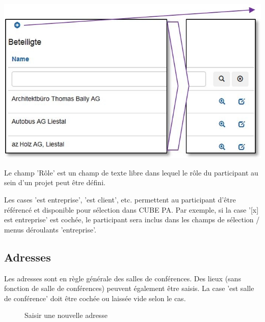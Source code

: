 \begin{center}
\hspace{-15pt}   
\includegraphics[width=.9\linewidth]{../chapters/13_Konfigurationen/pictures/13-4_Beteiligte.jpg}
\end{center}

Le champ 'Rôle' est un champ de texte libre dans lequel le rôle du participant au sein d'un projet peut être défini.

\vspace{\baselineskip}

Les cases 'est entreprise', 'est client', etc. permettent au participant d'être référencé et disponible pour sélection dans CUBE PA. Par exemple, si la case '[x] est entreprise' est cochée, le participant sera inclus dans les champs de sélection / menus déroulants 'entreprise'.

\vspace{\baselineskip}
\vspace{\baselineskip}
\vspace{\baselineskip}

\subsection{Adresses}

Les adresses sont en règle générale des salles de conférences. Des lieux (sans fonction de salle de conférences) peuvent également être saisis. La case 'est salle de conférence' doit être cochée ou laissée vide selon le cas.

\begin{figure}[H]
\caption{Saisir une nouvelle adresse}
\end{figure}

